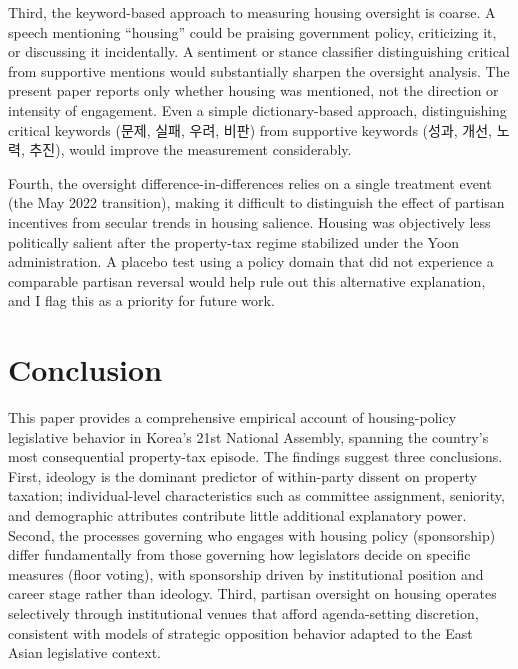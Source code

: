 \documentclass[11pt]{article}
\begin{document}
Third, the keyword-based approach to measuring housing oversight is coarse. A speech mentioning ``housing'' could be praising government policy, criticizing it, or discussing it incidentally. A sentiment or stance classifier distinguishing critical from supportive mentions would substantially sharpen the oversight analysis. The present paper reports only whether housing was mentioned, not the direction or intensity of engagement. Even a simple dictionary-based approach, distinguishing critical keywords (문제, 실패, 우려, 비판) from supportive keywords (성과, 개선, 노력, 추진), would improve the measurement considerably.

Fourth, the oversight difference-in-differences relies on a single treatment event (the May 2022 transition), making it difficult to distinguish the effect of partisan incentives from secular trends in housing salience. Housing was objectively less politically salient after the property-tax regime stabilized under the Yoon administration. A placebo test using a policy domain that did not experience a comparable partisan reversal would help rule out this alternative explanation, and I flag this as a priority for future work.


\section{Conclusion}
\label{sec:conclusion}

This paper provides a comprehensive empirical account of housing-policy legislative behavior in Korea's 21st National Assembly, spanning the country's most consequential property-tax episode. The findings suggest three conclusions. First, ideology is the dominant predictor of within-party dissent on property taxation; individual-level characteristics such as committee assignment, seniority, and demographic attributes contribute little additional explanatory power. Second, the processes governing who engages with housing policy (sponsorship) differ fundamentally from those governing how legislators decide on specific measures (floor voting), with sponsorship driven by institutional position and career stage rather than ideology. Third, partisan oversight on housing operates selectively through institutional venues that afford agenda-setting discretion, consistent with models of strategic opposition behavior adapted to the East Asian legislative context.
\end{document}
